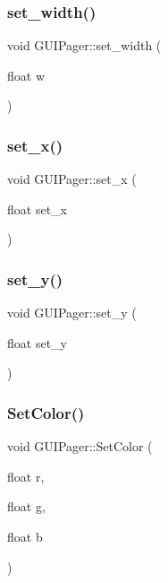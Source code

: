 \hypertarget{class_g_u_i_pager_a2e479060a39997aaf4ce49f21d1d1e25}{}\label{class_g_u_i_pager_a2e479060a39997aaf4ce49f21d1d1e25} 
\subsubsection{\texorpdfstring{set\+\_\+width()}{set\_width()}}
{\footnotesize\ttfamily void G\+U\+I\+Pager\+::set\+\_\+width (\begin{DoxyParamCaption}\item[{float}]{w }\end{DoxyParamCaption})}

\hypertarget{class_g_u_i_pager_ac7a79b1fd1f592faf00d92c0499d22b1}{}\label{class_g_u_i_pager_ac7a79b1fd1f592faf00d92c0499d22b1} 
\subsubsection{\texorpdfstring{set\+\_\+x()}{set\_x()}}
{\footnotesize\ttfamily void G\+U\+I\+Pager\+::set\+\_\+x (\begin{DoxyParamCaption}\item[{float}]{set\+\_\+x }\end{DoxyParamCaption})}

\hypertarget{class_g_u_i_pager_aab208d26c67d965874dd68d9fb5ab5ff}{}\label{class_g_u_i_pager_aab208d26c67d965874dd68d9fb5ab5ff} 
\subsubsection{\texorpdfstring{set\+\_\+y()}{set\_y()}}
{\footnotesize\ttfamily void G\+U\+I\+Pager\+::set\+\_\+y (\begin{DoxyParamCaption}\item[{float}]{set\+\_\+y }\end{DoxyParamCaption})}

\hypertarget{class_g_u_i_pager_a0cf8dbdac2c1411eb1b61dfbfb6a672b}{}\label{class_g_u_i_pager_a0cf8dbdac2c1411eb1b61dfbfb6a672b} 
\subsubsection{\texorpdfstring{Set\+Color()}{SetColor()}}
{\footnotesize\ttfamily void G\+U\+I\+Pager\+::\+Set\+Color (\begin{DoxyParamCaption}\item[{float}]{r,  }\item[{float}]{g,  }\item[{float}]{b }\end{DoxyParamCaption})}

